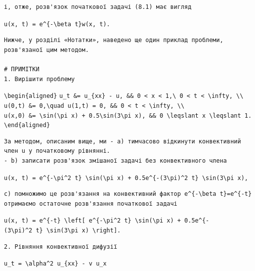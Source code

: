 \documentclass[
  ukrainian,
]{article}
\begin{document}
\begin{verbatim}
і, отже, розв'язок початкової задачі (8.1) має вигляд
\end{verbatim}

\texttt{u(x,\ t)\ =\ e\^{}\{-\textbackslash{}beta\ t\}w(x,\ t).}

\begin{verbatim}
Нижче, у розділі «Нотатки», наведено ще один приклад проблеми, розв'язаної цим методом.

# ПРИМІТКИ
1. Вирішити проблему
\end{verbatim}

\texttt{\textbackslash{}begin\{aligned\}}
\texttt{u\_t\ \&=\ u\_\{xx\}\ -\ u,\ \&\&\ 0\ \textless{}\ x\ \textless{}\ 1,\textbackslash{}\ 0\ \textless{}\ t\ \textless{}\ \textbackslash{}infty,\ \textbackslash{}\textbackslash{}}
\texttt{u(0,t)\ \&=\ 0,\textbackslash{}quad\ u(1,t)\ =\ 0,\ \&\&\ 0\ \textless{}\ t\ \textless{}\ \textbackslash{}infty,\ \textbackslash{}\textbackslash{}}
\texttt{u(x,0)\ \&=\ \textbackslash{}sin(\textbackslash{}pi\ x)\ +\ 0.5\textbackslash{}sin(3\textbackslash{}pi\ x),\ \&\&\ 0\ \textbackslash{}leqslant\ x\ \textbackslash{}leqslant\ 1.}
\texttt{\textbackslash{}end\{aligned\}}

\begin{verbatim}
За методом, описаним вище, ми - a) тимчасово відкинути конвективний член u у початковому рівнянні.
- b) записати розв'язок змішаної задачі без конвективного члена
\end{verbatim}

\texttt{u(x,\ t)\ =\ e\^{}\{-\textbackslash{}pi\^{}2\ t\}\ \textbackslash{}sin(\textbackslash{}pi\ x)\ +\ 0.5e\^{}\{-(3\textbackslash{}pi)\^{}2\ t\}\ \textbackslash{}sin(3\textbackslash{}pi\ x),}

\begin{verbatim}
c) помножимо це розв'язання на конвективний фактор e^{-\beta t}=e^{-t} отримаємо остаточне розв'язання початкової задачі
\end{verbatim}

\texttt{u(x,\ t)\ =\ e\^{}\{-t\}\ \textbackslash{}left{[}\ e\^{}\{-\textbackslash{}pi\^{}2\ t\}\ \textbackslash{}sin(\textbackslash{}pi\ x)\ +\ 0.5e\^{}\{-(3\textbackslash{}pi)\^{}2\ t\}\ \textbackslash{}sin(3\textbackslash{}pi\ x)\ \textbackslash{}right{]}.}

\begin{verbatim}
2. Рівняння конвективної дифузії
\end{verbatim}

\texttt{u\_t\ =\ \textbackslash{}alpha\^{}2\ u\_\{xx\}\ -\ v\ u\_x}
\end{document}
